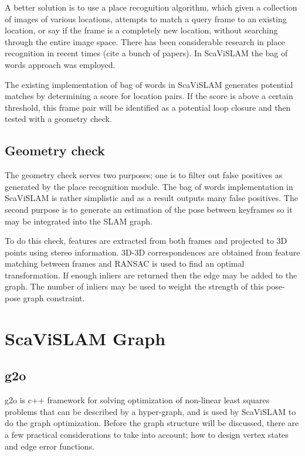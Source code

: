 A better solution is to use a place recognition algorithm, which given a collection of images of various locations, attempts to match a query frame to an existing location, or say if the frame is a completely new location, without searching through the entire image space.  There has been considerable research in place recognition in recent times (cite a bunch of papers).  In ScaViSLAM the bag of words approach was employed.


The existing implementation of bag of words in ScaViSLAM generates potential matches by determining a score for location pairs.  If the score is above a certain threshold, this frame pair will be identified as a potential loop closure and then tested with a geometry check.

\subsection{Geometry check}
\label{subsec:geometry_check}

The geometry check serves two purposes; one is to filter out false positives as generated by the place recognition module.  The bag of words implementation in ScaViSLAM is rather simplistic and as a result outputs many false positives.  The second purpose is to generate an estimation of the pose between keyframes so it may be integrated into the SLAM graph.  

To do this check, features are extracted from both frames and projected to 3D points using stereo information.  3D-3D correspondences are obtained from feature matching between frames and RANSAC is used to find an optimal transformation.  If enough inliers are returned then the edge may be added to the graph.  The number of inliers may be used to weight the strength of this pose-pose graph constraint.

\section{ScaViSLAM Graph}
\label{sec:scavislam_graph}
\subsection{g2o}

g2o is c++ framework for solving optimization of non-linear least squares problems that can be described by a hyper-graph, and is used by ScaViSLAM to do the graph optimization.  Before the graph structure will be discussed, there are a few practical considerations to take into account; how to design vertex states and edge error functions.

